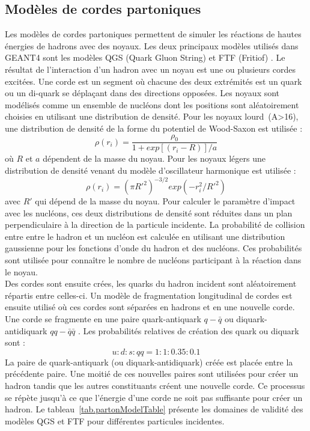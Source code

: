 \subsection{Modèles de cordes partoniques}
\label{sec.parton}
Les modèles de cordes partoniques permettent de simuler les réactions de hautes énergies de hadrons avec des noyaux. Les deux principaux modèles utilisés dans GEANT4 sont les modèles QGS (Quark Gluon String) et FTF (Fritiof) \cite{geant4_parton}. Le résultat de l'interaction d'un hadron avec un noyau est une ou plusieurs cordes excitées. Une corde est un segment où chacune des deux extrémités est un quark ou un di-quark se déplaçant dans des directions opposées. Les noyaux sont modélisés comme un ensemble de nucléons dont les positions sont aléatoirement choisies en utilisant une distribution de densité. Pour les noyaux lourd~(A>16), une distribution de densité de la forme du potentiel de Wood-Saxon est utilisée : 
\begin{equation}
  \label{eq.wood-saxon}
  \rho(r_i)=\frac{\rho_0}{1+exp[(r_i-R)]/a}
\end{equation}
où $R$ et $a$ dépendent de la masse du noyau. Pour les noyaux légers une distribution de densité venant du modèle d'oscillateur harmonique est utilisée : 
\begin{equation}
  \label{eq.harmonic-ocsillator}
  \rho(r_i)=(\pi R'^2)^{-3/2}exp(-r_i^2/R'^2)
\end{equation}
avec $R'$  qui dépend de la masse du noyau.
Pour calculer le paramètre d'impact avec les nucléons, ces deux distributions de densité sont réduites dans un plan perpendiculaire à la direction de la particule incidente. La probabilité de collision entre entre le hadron et un nucléon est calculée en utilisant une distribution gaussienne pour les fonctions d'onde du hadron et des nucléons. Ces probabilités sont utilisée pour connaître le nombre de nucléons participant à la réaction dans le noyau.\\
Des cordes sont ensuite crées, les quarks du hadron incident sont aléatoirement répartis entre celles-ci. Un modèle de fragmentation longitudinal de cordes est ensuite utilisé où ces cordes sont séparées en hadrons et en une nouvelle corde. Une corde se fragmente en une paire quark-antiquark $q-\bar q$ ou diquark-antidiquark $qq-\bar q \bar q$ \cite{geant4_reference}. Les probabilités relatives de création des quark ou diquark sont :
\begin{equation}
  u:d:s:qq = 1:1:0.35:0.1
\end{equation}
La paire de quark-antiquark (ou diquark-antidiquark) créée est placée entre la précédente paire. Une moitié de ces nouvelles paires sont utilisées pour créer un hadron tandis que les autres constituants créent une nouvelle corde. Ce processus se répète jusqu'à ce que l'énergie d'une corde ne soit pas suffisante pour créer un hadron. Le tableau~\ref{tab.partonModelTable} présente les domaines de validité des modèles QGS et FTF pour différentes particules incidentes.
